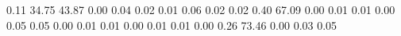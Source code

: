 0.11 34.75 43.87 
0.00 0.04 0.02 
0.01 0.06 0.02 
0.02 0.40 67.09 
0.00 0.01 0.01 
0.00 0.05 0.05 
0.00 0.01 0.01 
0.00 0.01 0.01 
0.00 0.26 73.46 
0.00 0.03 0.05 
